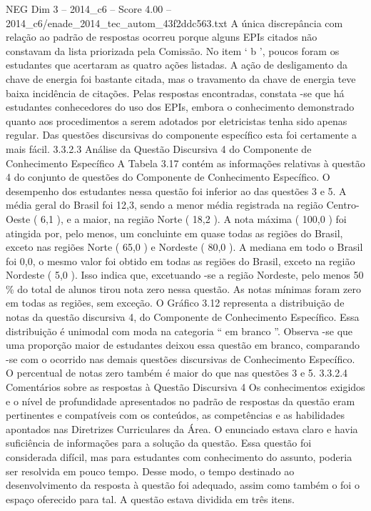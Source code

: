 \begin{textsample}{NEG Dim 3 – 2014\_c6 – Score 4.00 – 2014\_c6/enade\_2014\_tec\_autom\_43f2ddc563.txt}
A única discrepância com relação ao padrão de respostas ocorreu porque alguns EPIs citados não constavam da lista priorizada pela Comissão.
No item ‘ b ’, poucos foram os estudantes que acertaram as quatro ações listadas.
A ação de desligamento da chave de energia foi bastante citada, mas o travamento da chave de energia teve baixa incidência de citações.
Pelas respostas encontradas, constata -se que há estudantes conhecedores do uso dos EPIs, embora o conhecimento demonstrado quanto aos procedimentos a serem adotados por eletricistas tenha sido apenas regular.
Das questões discursivas do componente específico esta foi certamente a mais fácil. 3.3.2.3 Análise da Questão Discursiva 4 do Componente de Conhecimento Específico A Tabela 3.17 contém as informações relativas à questão 4 do conjunto de questões do Componente de Conhecimento Específico.
O desempenho dos estudantes nessa questão foi inferior ao das questões 3 e 5.
A média geral do Brasil foi 12,3, sendo a menor média registrada na região Centro-Oeste ( 6,1 ), e a maior, na região Norte ( 18,2 ).
A nota máxima ( 100,0 ) foi atingida por, pelo menos, um concluinte em quase todas as regiões do Brasil, exceto nas regiões Norte ( 65,0 ) e Nordeste ( 80,0 ).
A mediana em todo o Brasil foi 0,0, o mesmo valor foi obtido em todas as regiões do Brasil, exceto na região Nordeste ( 5,0 ).
Isso indica que, excetuando -se a região Nordeste, pelo menos 50 \% do total de alunos tirou nota zero nessa questão.
As notas mínimas foram zero em todas as regiões, sem exceção.
O Gráfico 3.12 representa a distribuição de notas da questão discursiva 4, do Componente de Conhecimento Específico.
Essa distribuição é unimodal com moda na categoria “ em branco ”.
Observa -se que uma proporção maior de estudantes deixou essa questão em branco, comparando -se com o ocorrido nas demais questões discursivas de Conhecimento Específico.
O percentual de notas zero também é maior do que nas questões 3 e 5. 3.3.2.4 Comentários sobre as respostas à Questão Discursiva 4 Os conhecimentos exigidos e o nível de profundidade apresentados no padrão de respostas da questão eram pertinentes e compatíveis com os conteúdos, as competências e as habilidades apontados nas Diretrizes Curriculares da Área.
O enunciado estava claro e havia suficiência de informações para a solução da questão.
Essa questão foi considerada difícil, mas para estudantes com conhecimento do assunto, poderia ser resolvida em pouco tempo.
Desse modo, o tempo destinado ao desenvolvimento da resposta à questão foi adequado, assim como também o foi o espaço oferecido para tal.
A questão estava dividida em três itens.

\end{textsample}
